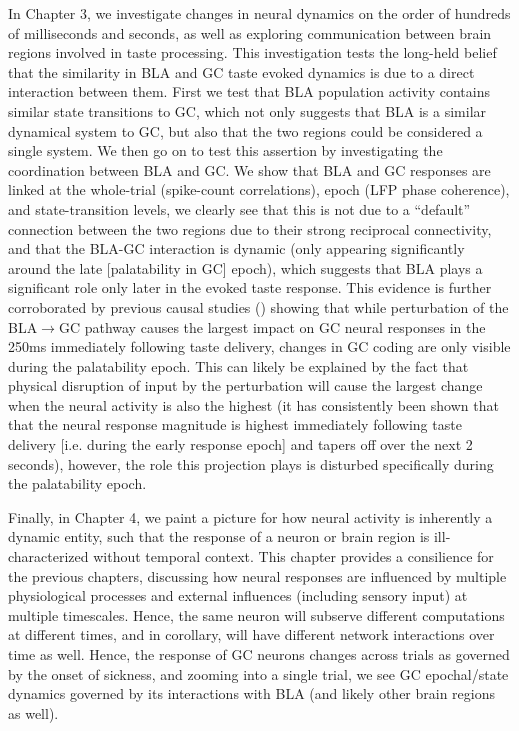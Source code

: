 \begin{refsection}
In Chapter 3, we investigate changes in neural dynamics on the order of hundreds of milliseconds and seconds, as well as exploring communication between brain regions involved in taste processing. This investigation tests the long-held belief that the similarity in BLA and GC taste evoked dynamics is due to a direct interaction between them. First we test that BLA population activity contains similar state transitions to GC, which not only suggests that BLA is a similar dynamical system to GC, but also that the two regions could be considered a single system. We then go on to test this assertion by investigating the coordination between BLA and GC. We show that BLA and GC responses are linked at the whole-trial (spike-count correlations), epoch (LFP phase coherence), and state-transition levels, we clearly see that this is not due to a “default” connection between the two regions due to their strong reciprocal connectivity, and that the BLA-GC interaction is dynamic (only appearing significantly around the late [palatability in GC] epoch), which suggests that BLA plays a significant role only later in the evoked taste response. This evidence is further corroborated by previous causal studies (\cite{lin2021a}) showing that while perturbation of the BLA$\rightarrow$GC pathway causes the largest impact on GC neural responses in the 250ms immediately following taste delivery, changes in GC coding are only visible during the palatability epoch. This can likely be explained by the fact that physical disruption of input by the perturbation will cause the largest change when the neural activity is also the highest (it has consistently been shown that that the neural response magnitude is highest immediately following taste delivery [i.e. during the early response epoch] and tapers off over the next 2 seconds), however, the role this projection plays is disturbed specifically during the palatability epoch.

Finally, in Chapter 4, we paint a picture for how neural activity is inherently a dynamic entity, such that the response of a neuron or brain region is ill-characterized without temporal context. This chapter provides a consilience for the previous chapters, discussing how neural responses are influenced by multiple physiological processes and external influences (including sensory input) at multiple timescales. Hence, the same neuron will subserve different computations at different times, and in corollary, will have different network interactions over time as well. Hence, the response of GC neurons changes across trials as governed by the onset of sickness, and zooming into a single trial, we see GC epochal/state dynamics governed by its interactions with BLA (and likely other brain regions as well).


\end{refsection}
